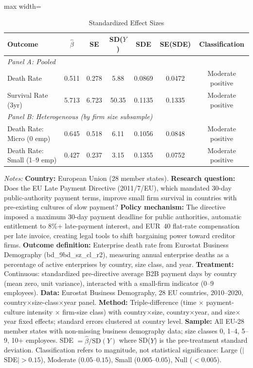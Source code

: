 \begin{table}[htbp]
\centering
\caption{Standardized Effect Sizes}
\label{tab:sde}
\begin{adjustbox}{max width=\textwidth}
\begin{tabular}{lcccccc}
\hline\hline
Outcome & $\hat{\beta}$ & SE & SD($Y$) & SDE & SE(SDE) & Classification \\
\hline
\multicolumn{7}{l}{\textit{Panel A: Pooled}} \\
Death Rate & 0.511 & 0.278 & 5.88 & 0.0869 & 0.0472 & Moderate positive \\
Survival Rate (3yr) & 5.713 & 6.723 & 50.35 & 0.1135 & 0.1335 & Moderate positive \\
\hline
\multicolumn{7}{l}{\textit{Panel B: Heterogeneous (by firm size subsample)}} \\
Death Rate: Micro (0 emp) & 0.645 & 0.518 & 6.11 & 0.1056 & 0.0848 & Moderate positive \\
Death Rate: Small (1--9 emp) & 0.427 & 0.237 & 3.15 & 0.1355 & 0.0752 & Moderate positive \\
\hline\hline
\end{tabular}
\end{adjustbox}
\begin{tablenotes}[flushleft]\footnotesize
\item \textit{Notes:} \textbf{Country:} European Union (28 member states). \textbf{Research question:} Does the EU Late Payment Directive (2011/7/EU), which mandated 30-day public-authority payment terms, improve small firm survival in countries with pre-existing cultures of slow payment? \textbf{Policy mechanism:} The directive imposed a maximum 30-day payment deadline for public authorities, automatic entitlement to 8\%+ late-payment interest, and EUR~40 flat-rate compensation per late invoice, creating legal tools to shift bargaining power toward creditor firms. \textbf{Outcome definition:} Enterprise death rate from Eurostat Business Demography (bd\_9bd\_sz\_cl\_r2), measuring annual enterprise deaths as a percentage of active enterprises by country, size class, and year. \textbf{Treatment:} Continuous: standardized pre-directive average B2B payment days by country (mean zero, unit variance), interacted with a small-firm indicator (0--9 employees). \textbf{Data:} Eurostat Business Demography, 28 EU countries, 2010--2020, country$\times$size-class$\times$year panel. \textbf{Method:} Triple-difference (time $\times$ payment-culture intensity $\times$ firm-size class) with country$\times$size, country$\times$year, and size$\times$year fixed effects; standard errors clustered at country level. \textbf{Sample:} All EU-28 member states with non-missing business demography data; size classes 0, 1--4, 5--9, 10+ employees. SDE $= \hat{\beta} / \text{SD}(Y)$ where SD($Y$) is the pre-treatment standard deviation. Classification refers to magnitude, not statistical significance: Large ($|$SDE$| > 0.15$), Moderate ($0.05$--$0.15$), Small ($0.005$--$0.05$), Null ($< 0.005$). 
\end{tablenotes}
\end{table}
